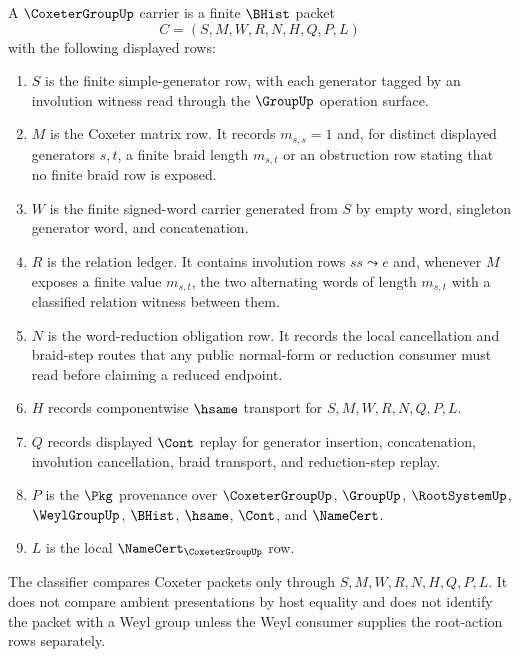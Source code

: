 \begin{definition}
\label{def:coxeter-group-carrier}
A $\CoxeterGroupUp$ carrier is a finite $\BHist$ packet
$$
C=(S,M,W,R,N,H,Q,P,L)
$$
with the following displayed rows:
\begin{enumerate}
\item $S$ is the finite simple-generator row, with each generator tagged by an involution witness read through the $\GroupUp$ operation surface.
\item $M$ is the Coxeter matrix row. It records $m_{s,s}=1$ and, for distinct displayed generators $s,t$, a finite braid length $m_{s,t}$ or an obstruction row stating that no finite braid row is exposed.
\item $W$ is the finite signed-word carrier generated from $S$ by empty word, singleton generator word, and concatenation.
\item $R$ is the relation ledger. It contains involution rows $ss \leadsto e$ and, whenever $M$ exposes a finite value $m_{s,t}$, the two alternating words of length $m_{s,t}$ with a classified relation witness between them.
\item $N$ is the word-reduction obligation row. It records the local cancellation and braid-step routes that any public normal-form or reduction consumer must read before claiming a reduced endpoint.
\item $H$ records componentwise $\hsame$ transport for $S,M,W,R,N,Q,P,L$.
\item $Q$ records displayed $\Cont$ replay for generator insertion, concatenation, involution cancellation, braid transport, and reduction-step replay.
\item $P$ is the $\Pkg$ provenance over $\CoxeterGroupUp$, $\GroupUp$, $\RootSystemUp$, $\WeylGroupUp$, $\BHist$, $\hsame$, $\Cont$, and $\NameCert$.
\item $L$ is the local $\NameCert_{\CoxeterGroupUp}$ row.
\end{enumerate}
The classifier compares Coxeter packets only through $S,M,W,R,N,H,Q,P,L$. It does not compare ambient presentations by host equality and does not identify the packet with a Weyl group unless the Weyl consumer supplies the root-action rows separately.
\end{definition}

